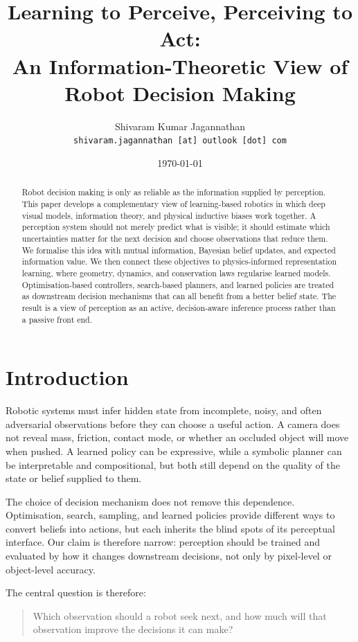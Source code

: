 \documentclass[11pt]{article}
\title{Learning to Perceive, Perceiving to Act:\\
  An Information-Theoretic View of Robot Decision Making}
\author{Shivaram Kumar Jagannathan\\
  \small{\texttt{shivaram.jagannathan [at] outlook [dot] com}}}
\date{\today}
\begin{document}
\maketitle

\begin{abstract}
Robot decision making is only as reliable as the information supplied by
perception. This paper develops a complementary view of learning-based
robotics in which deep visual models, information theory, and physical
inductive biases work together. A perception system should not merely predict
what is visible; it should estimate which uncertainties matter for the next
decision and choose observations that reduce them. We formalise this idea with
mutual information, Bayesian belief updates, and expected information value.
We then connect these objectives to physics-informed representation learning,
where geometry, dynamics, and conservation laws regularise learned models.
Optimisation-based controllers, search-based planners, and learned policies
are treated as downstream decision mechanisms that can all benefit from a
better belief state. The result is a view of perception as an active,
decision-aware inference process rather than a passive front end.
\end{abstract}

\section{Introduction}
\label{sec:intro}

Robotic systems must infer hidden state from incomplete, noisy, and often
adversarial observations before they can choose a useful action. A camera does
not reveal mass, friction, contact mode, or whether an occluded object will
move when pushed. A learned policy can be expressive, while a symbolic planner
can be interpretable and compositional, but both still depend on the quality of
the state or belief supplied to them.

The choice of decision mechanism does not remove this dependence. Optimisation,
search, sampling, and learned policies provide different ways to convert beliefs
into actions, but each inherits the blind spots of its perceptual interface. Our
claim is therefore narrow: perception should be trained and evaluated by how it
changes downstream decisions, not only by pixel-level or object-level accuracy.

The central question is therefore:
\begin{quote}
  Which observation should a robot seek next, and how much will that
  observation improve the decisions it can make?
\end{quote}
\end{document}
